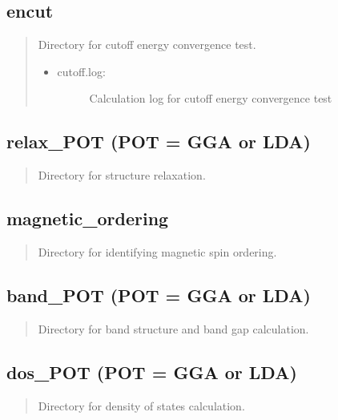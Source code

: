 \documentclass[letterpaper,10pt,english]{sphinxmanual}
\begin{document}
\subsection{encut}
\label{\detokenize{Output/Output:encut}}\begin{quote}

Directory for cutoff energy convergence test.
\begin{itemize}
\item {} \begin{description}
\item[{cutoff.log:}] \leavevmode
Calculation log for cutoff energy convergence test

\end{description}

\end{itemize}
\end{quote}


\subsection{relax\_POT (POT = GGA or LDA)}
\label{\detokenize{Output/Output:relax-pot-pot-gga-or-lda}}\begin{quote}

Directory for structure relaxation.
\end{quote}


\subsection{magnetic\_ordering}
\label{\detokenize{Output/Output:magnetic-ordering}}\begin{quote}

Directory for identifying magnetic spin ordering.
\end{quote}


\subsection{band\_POT (POT = GGA or LDA)}
\label{\detokenize{Output/Output:band-pot-pot-gga-or-lda}}\begin{quote}

Directory for band structure and band gap calculation.
\end{quote}


\subsection{dos\_POT (POT = GGA or LDA)}
\label{\detokenize{Output/Output:dos-pot-pot-gga-or-lda}}\begin{quote}

Directory for density of states calculation.
\end{quote}
\end{document}
